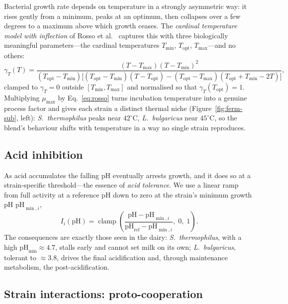 Bacterial growth rate depends on temperature in a strongly asymmetric way: it
rises gently from a minimum, peaks at an optimum, then collapses over a few degrees
to a maximum above which growth ceases. The \emph{cardinal temperature model with
inflection} of Rosso et al.~\cite{rosso} captures this with three biologically
meaningful parameters---the cardinal temperatures $T_{\min}$, $T_{\mathrm{opt}}$,
$T_{\max}$---and no others:
%
\begin{equation}
\gamma_{T}(T) =
\frac{(T-T_{\max})(T-T_{\min})^2}
     {(T_{\mathrm{opt}}-T_{\min})
      \bigl[(T_{\mathrm{opt}}-T_{\min})(T-T_{\mathrm{opt}})
           -(T_{\mathrm{opt}}-T_{\max})(T_{\mathrm{opt}}+T_{\min}-2T)\bigr]},
\label{eq:rosso}
\end{equation}
%
clamped to $\gamma_T=0$ outside $[T_{\min},T_{\max}]$ and normalised so that
$\gamma_T(T_{\mathrm{opt}})=1$. Multiplying $\mu_{\max}$ by
Eq.~\eqref{eq:rosso} turns incubation temperature into a genuine process factor and
gives each strain a distinct thermal niche (Figure~\ref{fig:ferm-sub}, left):
\emph{S.\ thermophilus} peaks near $42^\circ$C, \emph{L.\ bulgaricus} near
$45^\circ$C, so the blend's behaviour shifts with temperature in a way no single
strain reproduces.

\subsection{Acid inhibition}

As acid accumulates the falling pH eventually arrests growth, and it does so at a
strain-specific threshold---the essence of \emph{acid tolerance}. We use a linear
ramp from full activity at a reference pH down to zero at the strain's minimum
growth pH $\mathrm{pH}_{\min,i}$,
%
\begin{equation}
I_i(\mathrm{pH}) =
\operatorname{clamp}\!\left(
\frac{\mathrm{pH}-\mathrm{pH}_{\min,i}}{\mathrm{pH}_{\mathrm{ref}}-\mathrm{pH}_{\min,i}},
\;0,\;1\right).
\label{eq:acid-inhib}
\end{equation}
%
The consequences are exactly those seen in the dairy: \emph{S.\ thermophilus}, with
a high $\mathrm{pH}_{\min}\approx 4.7$, stalls early and cannot set milk on its
own; \emph{L.\ bulgaricus}, tolerant to $\approx 3.8$, drives the final
acidification and, through maintenance metabolism, the post-acidification.

\subsection{Strain interactions: proto-cooperation}

